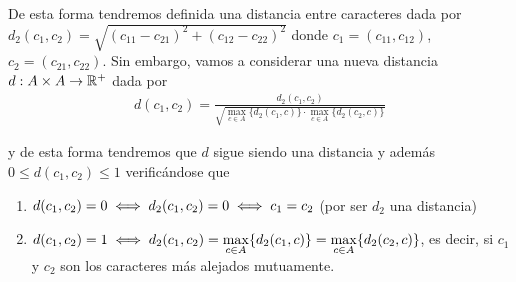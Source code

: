 \documentclass[12pt]{article}
\begin{document}
De esta forma tendremos definida una distancia entre caracteres dada por $d_2(c_1, c_2) = \sqrt{(c_{11} - c_{21})^2 + (c_{12} - c_{22})^2}$ donde $c_1=(c_{11}, c_{12})$, $c_2=(c_{21}, c_{22})$. Sin embargo, vamos a considerar una nueva distancia $d:A\times A \to \mathbb{R}^+$ dada por 
\begin{align*}
    d(c_1, c_2) = \frac{d_2(c_1, c_2)}{\sqrt{\max\limits_{c\in A}\{d_2(c_1, c)\} \cdot \max\limits_{c\in A}\{d_2(c_2, c)\}}}
\end{align*}

y de esta forma tendremos que $d$ sigue siendo una distancia y además $0 \leq d(c_1, c_2) \leq 1$ verificándose que 
\begin{enumerate}
    \item $d(c_1, c_2) = 0 \iff d_2(c_1,c_2)=0 \iff c_1=c_2$ (por ser $d_2$ una distancia)
    \item $d(c_1, c_2) = 1 \iff d_2(c_1, c_2) =\max\limits_{c\in A}\{d_2(c_1, c)\} = \max\limits_{c\in A}\{d_2(c_2, c)\}$, es decir, si $c_1$ y $c_2$ son los caracteres más alejados mutuamente.
\end{enumerate}
\end{document}
